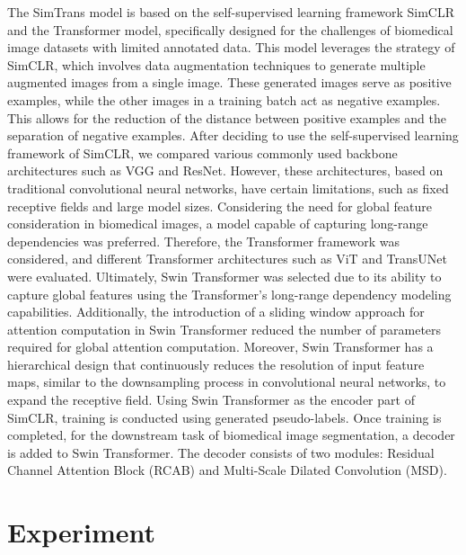 \documentclass[10pt,twocolumn,a4paper]{article}
\begin{document}
The SimTrans model is based on the self-supervised learning framework SimCLR and the Transformer model, specifically designed for the challenges of biomedical image datasets with limited annotated data. This model leverages the strategy of SimCLR, which involves data augmentation techniques to generate multiple augmented images from a single image. These generated images serve as positive examples, while the other images in a training batch act as negative examples. This allows for the reduction of the distance between positive examples and the separation of negative examples.
After deciding to use the self-supervised learning framework of SimCLR, we compared various commonly used backbone architectures such as VGG and ResNet. However, these architectures, based on traditional convolutional neural networks, have certain limitations, such as fixed receptive fields and large model sizes. Considering the need for global feature consideration in biomedical images, a model capable of capturing long-range dependencies was preferred. Therefore, the Transformer framework was considered, and different Transformer architectures such as ViT and TransUNet were evaluated. Ultimately, Swin Transformer was selected due to its ability to capture global features using the Transformer's long-range dependency modeling capabilities. Additionally, the introduction of a sliding window approach for attention computation in Swin Transformer reduced the number of parameters required for global attention computation. Moreover, Swin Transformer has a hierarchical design that continuously reduces the resolution of input feature maps, similar to the downsampling process in convolutional neural networks, to expand the receptive field.
Using Swin Transformer as the encoder part of SimCLR, training is conducted using generated pseudo-labels. Once training is completed, for the downstream task of biomedical image segmentation, a decoder is added to Swin Transformer. The decoder consists of two modules: Residual Channel Attention Block (RCAB) and Multi-Scale Dilated Convolution (MSD).


\section{Experiment}
\label{sec:experiment}
\end{document}
